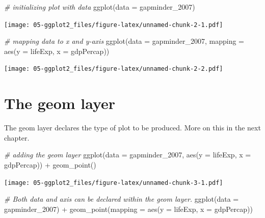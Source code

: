 \documentclass[
]{book}
\newenvironment{Shaded}{\begin{snugshade}}{\end{snugshade}}
\newcommand{\AttributeTok}[1]{\textcolor[rgb]{0.77,0.63,0.00}{#1}}
\newcommand{\CommentTok}[1]{\textcolor[rgb]{0.56,0.35,0.01}{\textit{#1}}}
\newcommand{\FunctionTok}[1]{\textcolor[rgb]{0.00,0.00,0.00}{#1}}
\newcommand{\NormalTok}[1]{#1}
\newcommand{\SpecialCharTok}[1]{\textcolor[rgb]{0.00,0.00,0.00}{#1}}
\begin{document}
\begin{Shaded}
\begin{Highlighting}[]
\CommentTok{\# initializing plot with data}
\FunctionTok{ggplot}\NormalTok{(}\AttributeTok{data =}\NormalTok{ gapminder\_2007)}
\end{Highlighting}
\end{Shaded}

\texttt{[image: 05-ggplot2\_files/figure-latex/unnamed-chunk-2-1.pdf]}

\begin{Shaded}
\begin{Highlighting}[]
\CommentTok{\# mapping data to x and y{-}axis}
\FunctionTok{ggplot}\NormalTok{(}\AttributeTok{data =}\NormalTok{ gapminder\_2007,  }\AttributeTok{mapping =} \FunctionTok{aes}\NormalTok{(}\AttributeTok{y =}\NormalTok{ lifeExp, }\AttributeTok{x =}\NormalTok{ gdpPercap))}
\end{Highlighting}
\end{Shaded}

\texttt{[image: 05-ggplot2\_files/figure-latex/unnamed-chunk-2-2.pdf]}

\hypertarget{the-geom-layer}{%
\section{The geom layer}\label{the-geom-layer}}

The geom layer declares the type of plot to be produced. More on this in the next chapter.

\begin{Shaded}
\begin{Highlighting}[]
\CommentTok{\# adding the geom layer}
\FunctionTok{ggplot}\NormalTok{(}\AttributeTok{data =}\NormalTok{ gapminder\_2007, }\FunctionTok{aes}\NormalTok{(}\AttributeTok{y =}\NormalTok{ lifeExp, }\AttributeTok{x =}\NormalTok{ gdpPercap)) }\SpecialCharTok{+} 
  \FunctionTok{geom\_point}\NormalTok{()}
\end{Highlighting}
\end{Shaded}

\texttt{[image: 05-ggplot2\_files/figure-latex/unnamed-chunk-3-1.pdf]}

\begin{Shaded}
\begin{Highlighting}[]

\CommentTok{\# Both data and axis can be declared within the geom layer.}
\FunctionTok{ggplot}\NormalTok{(}\AttributeTok{data =}\NormalTok{ gapminder\_2007) }\SpecialCharTok{+} 
  \FunctionTok{geom\_point}\NormalTok{(}\AttributeTok{mapping =} \FunctionTok{aes}\NormalTok{(}\AttributeTok{y =}\NormalTok{ lifeExp, }\AttributeTok{x =}\NormalTok{ gdpPercap))}
\end{Highlighting}
\end{Shaded}
\end{document}
